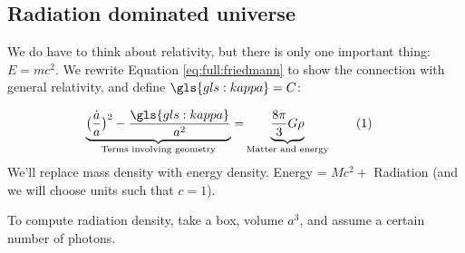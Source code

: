 \documentclass[]{article}
\newcommand\numberthis{\addtocounter{equation}{1}\tag{\theequation}}
\begin{document}
\subsection{Radiation dominated universe}\label{sec:radiation:dominated}

We do have to think about relativity, but there is only one important thing: $E=mc^2$. We rewrite Equation \eqref{eq:full:friedmann} to show the connection with general relativity, and define $\gls{gls:kappa} = C$:

\begin{align*}
	\underbrace{\big(\frac{\dot{a}}{a}\big)^2  - \frac{\gls{gls:kappa}}{a^2}}_\text{Terms involving geometry}=& \underbrace{\frac{8\pi}{3} G \rho}_\text{Matter and energy} \numberthis \label{eq:geometry:energy}
\end{align*}
We'll replace mass density with energy density. Energy = $Mc^2 + $ Radiation (and we will choose units such that $c=1$).

To compute radiation density, take a box, volume $a^3$, and assume a certain number of photons.
\end{document}

